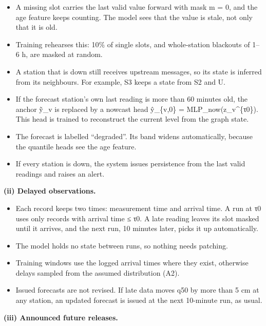 \documentclass[11pt]{article}
\providecommand{\tightlist}{}
\begin{document}
\begin{itemize}
\tightlist
\item
  A missing slot carries the last valid value forward with mask m = 0, and the age feature keeps counting. The model sees that the value is stale, not only that it is old.
\item
  Training rehearses this: 10\% of single slots, and whole-station blackouts of 1--6 h, are masked at random.
\item
  A station that is down still receives upstream messages, so its state is inferred from its neighbours. For example, S3 keeps a state from S2 and U.
\item
  If the forecast station's own last reading is more than 60 minutes old, the anchor ỹ\_v is replaced by a nowcast head ŷ\_\{v,0\} = MLP\_now(z\_v\^{}\{τ0\}). This head is trained to reconstruct the current level from the graph state.
\item
  The forecast is labelled ``degraded''. Its band widens automatically, because the quantile heads see the age feature.
\item
  If every station is down, the system issues persistence from the last valid readings and raises an alert.
\end{itemize}

\textbf{(ii) Delayed observations.}

\begin{itemize}
\tightlist
\item
  Each record keeps two times: measurement time and arrival time. A run at τ0 uses only records with arrival time ≤ τ0. A late reading leaves its slot masked until it arrives, and the next run, 10 minutes later, picks it up automatically.
\item
  The model holds no state between runs, so nothing needs patching.
\item
  Training windows use the logged arrival times where they exist, otherwise delays sampled from the assumed distribution (A2).
\item
  Issued forecasts are not revised. If late data moves q50 by more than 5 cm at any station, an updated forecast is issued at the next 10-minute run, as usual.
\end{itemize}

\textbf{(iii) Announced future releases.}
\end{document}
